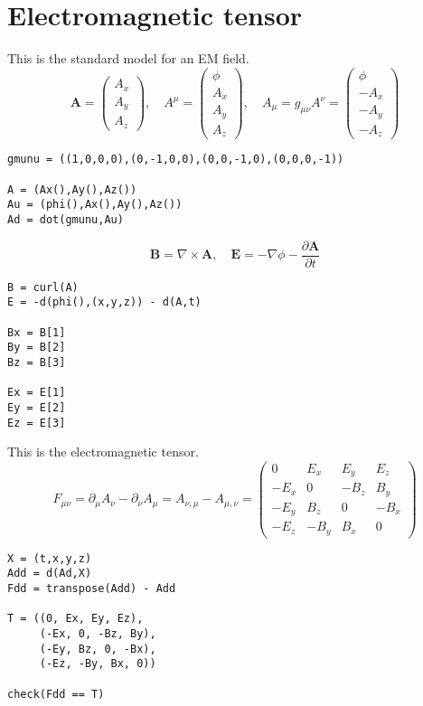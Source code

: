 \documentclass[12pt]{article}
\begin{document}
\section*{Electromagnetic tensor}

This is the standard model for an EM field.
\begin{equation*}
\mathbf A=\begin{pmatrix}A_x\\A_y\\A_z\end{pmatrix},\quad
A^\mu=\begin{pmatrix}\phi\\A_x\\A_y\\A_z\end{pmatrix},\quad
A_\mu=g_{\mu\nu}A^\nu=\begin{pmatrix}\phi\\-A_x\\-A_y\\-A_z\end{pmatrix}
\end{equation*}
{\footnotesize
\begin{verbatim}
gmunu = ((1,0,0,0),(0,-1,0,0),(0,0,-1,0),(0,0,0,-1))

A = (Ax(),Ay(),Az())
Au = (phi(),Ax(),Ay(),Az())
Ad = dot(gmunu,Au)
\end{verbatim}}

\begin{equation*}
\mathbf B=\nabla\times\mathbf A,\quad
\mathbf E=-\nabla\phi-\frac{\partial\mathbf A}{\partial t}
\end{equation*}
{\footnotesize
\begin{verbatim}
B = curl(A)
E = -d(phi(),(x,y,z)) - d(A,t)

Bx = B[1]
By = B[2]
Bz = B[3]

Ex = E[1]
Ey = E[2]
Ez = E[3]
\end{verbatim}}

This is the electromagnetic tensor.
\begin{equation*}
F_{\mu\nu}
=\partial_\mu A_\nu-\partial_\nu A_\mu
=A_{\nu,\mu}-A_{\mu,\nu}
=\begin{pmatrix}
0 & E_x & E_y & E_z
\\
-E_x & 0 & -B_z & B_y
\\
-E_y & B_z & 0 & -B_x
\\
-E_z & -B_y & B_x & 0
\end{pmatrix}
\end{equation*}
{\footnotesize
\begin{verbatim}
X = (t,x,y,z)
Add = d(Ad,X)
Fdd = transpose(Add) - Add

T = ((0, Ex, Ey, Ez),
     (-Ex, 0, -Bz, By),
     (-Ey, Bz, 0, -Bx),
     (-Ez, -By, Bx, 0))

check(Fdd == T)
\end{verbatim}}
\end{document}
